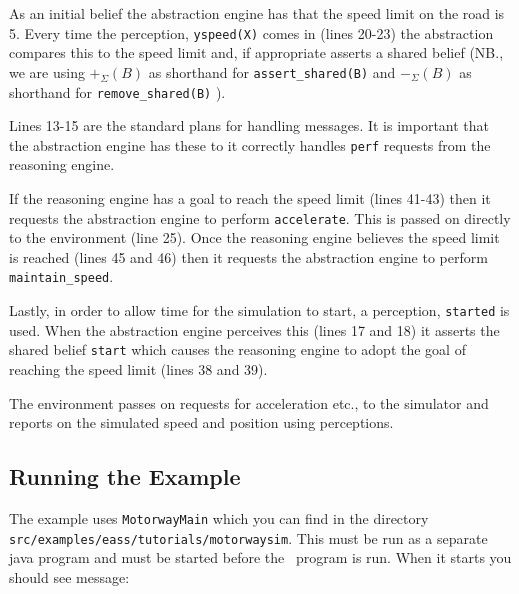 As an initial belief the abstraction engine has that the speed limit on the road is 5.  Every time the perception, \lstinline{yspeed(X)} comes in (lines 20-23) the abstraction compares this to the speed limit and, if appropriate asserts a shared belief (NB., we are using $+_{\Sigma}(B)$ as shorthand for \lstinline{assert_shared(B)} and  $-_{\Sigma}(B)$ as shorthand for \lstinline{remove_shared(B)} ).

Lines 13-15 are the standard plans for handling messages.  It is important that the abstraction engine has these to it correctly handles \texttt{perf} requests from the reasoning engine.

If the reasoning engine has a goal to reach the speed limit (lines 41-43) then it requests the abstraction engine to perform \lstinline{accelerate}.  This is passed on directly to the environment (line 25).  Once the reasoning engine believes the speed limit is reached (lines 45 and 46) then it requests the abstraction engine to perform \lstinline{maintain_speed}.

Lastly, in order to allow time for the simulation to start, a perception, \lstinline{started} is used.  When the abstraction engine perceives this (lines 17 and 18) it asserts the shared belief \lstinline{start} which causes the reasoning engine to adopt the goal of reaching the speed limit (lines 38 and 39).

The environment passes on requests for acceleration etc., to the simulator and reports on the simulated speed and position using perceptions.

\subsection{Running the Example}

\begin{sloppypar}
The example uses \texttt{MotorwayMain} which you can find in the directory \texttt{src/examples/eass/tutorials/motorwaysim}.  This must be run as a separate java program and must be started before the \eass\ program is run.  When it starts you should see message:
\end{sloppypar}

